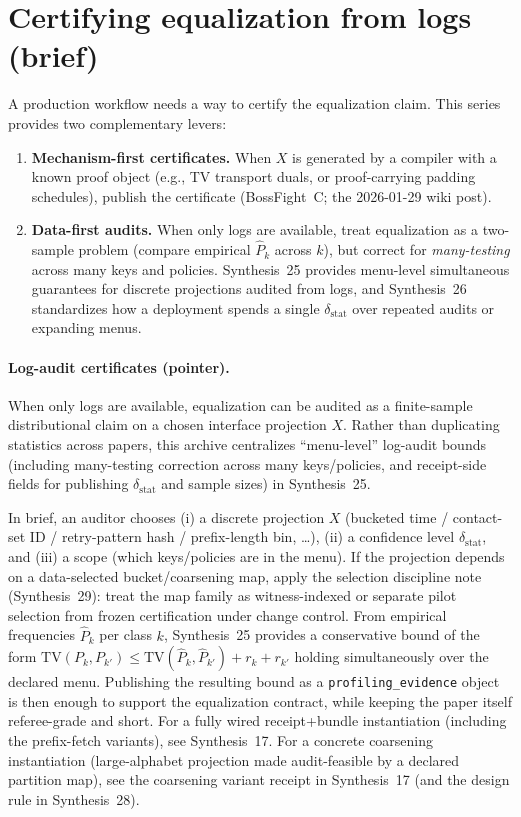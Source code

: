 \documentclass[11pt]{article}
\newcommand{\TV}{\mathrm{TV}}
\begin{document}
\section{Certifying equalization from logs (brief)}
A production workflow needs a way to certify the equalization claim.
This series provides two complementary levers:
\begin{enumerate}[leftmargin=*]
\item \textbf{Mechanism-first certificates.} When $X$ is generated by a compiler with a known proof object (e.g., TV transport duals, or proof-carrying padding schedules), publish the certificate (BossFight~C; the 2026-01-29 wiki post).
\item \textbf{Data-first audits.} When only logs are available, treat equalization as a two-sample problem (compare empirical $\widehat P_k$ across $k$), but correct for \emph{many-testing} across many keys and policies.
Synthesis~25 provides menu-level simultaneous guarantees for discrete projections audited from logs, and Synthesis~26 standardizes how a deployment spends a single $\delta_{\mathrm{stat}}$ over repeated audits or expanding menus.\cite{series:stataudit,series:anytimespend}
\end{enumerate}

\paragraph{Log-audit certificates (pointer).}
When only logs are available, equalization can be audited as a finite-sample distributional claim on a chosen interface projection $X$.
Rather than duplicating statistics across papers, this archive centralizes ``menu-level'' log-audit bounds (including many-testing correction across many keys/policies, and receipt-side fields for publishing $\delta_{\mathrm{stat}}$ and sample sizes) in Synthesis~25.\cite{series:stataudit}

In brief, an auditor chooses (i) a discrete projection $X$ (bucketed time / contact-set ID / retry-pattern hash / prefix-length bin, \dots), (ii) a confidence level $\delta_{\mathrm{stat}}$, and (iii) a scope (which keys/policies are in the menu).
If the projection depends on a data-selected bucket/coarsening map, apply the selection discipline note (Synthesis~29): treat the map family as witness-indexed or separate pilot selection from frozen certification under change control.\cite{series:selectiondiscipline}
From empirical frequencies $\widehat P_k$ per class $k$, Synthesis~25 provides a conservative bound of the form
$\TV(P_k,P_{k'}) \le \TV(\widehat P_k,\widehat P_{k'}) + r_k + r_{k'}$
holding simultaneously over the declared menu.
Publishing the resulting bound as a \texttt{profiling\_evidence} object is then enough to support the equalization contract, while keeping the paper itself referee-grade and short.
For a fully wired receipt+bundle instantiation (including the prefix-fetch variants), see Synthesis~17.\cite{series:workedexample}
For a concrete coarsening instantiation (large-alphabet projection made audit-feasible by a declared partition map), see the coarsening variant receipt in Synthesis~17 (and the design rule in Synthesis~28).\cite{series:coarsening}
\end{document}
